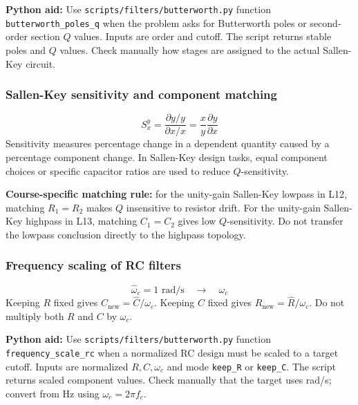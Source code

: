 \textbf{Python aid:} Use \texttt{scripts/filters/butterworth.py} function \texttt{butterworth\_poles\_q} when the problem asks for Butterworth poles or second-order section \(Q\) values. Inputs are order and cutoff. The script returns stable poles and \(Q\) values. Check manually how stages are assigned to the actual Sallen-Key circuit.

\subsubsection{Sallen-Key sensitivity and component matching}
\[
S_x^y=\frac{\partial y/y}{\partial x/x}=\frac{x}{y}\frac{\partial y}{\partial x}
\]
Sensitivity measures percentage change in a dependent quantity caused by a percentage component change. In Sallen-Key design tasks, equal component choices or specific capacitor ratios are used to reduce \(Q\)-sensitivity.

\textbf{Course-specific matching rule:} for the unity-gain Sallen-Key lowpass in L12, matching \(R_1=R_2\) makes \(Q\) insensitive to resistor drift. For the unity-gain Sallen-Key highpass in L13, matching \(C_1=C_2\) gives low \(Q\)-sensitivity. Do not transfer the lowpass conclusion directly to the highpass topology.

\subsubsection{Frequency scaling of RC filters}
\[
\hat\omega_c=1\text{ rad/s}\quad\to\quad \omega_c
\]
Keeping \(R\) fixed gives \(C_{\mathrm{new}}=\hat C/\omega_c\). Keeping \(C\) fixed gives \(R_{\mathrm{new}}=\hat R/\omega_c\). Do not multiply both \(R\) and \(C\) by \(\omega_c\).

\textbf{Python aid:} Use \texttt{scripts/filters/butterworth.py} function \texttt{frequency\_scale\_rc} when a normalized RC design must be scaled to a target cutoff. Inputs are normalized \(R,C,\omega_c\) and mode \texttt{keep\_R} or \texttt{keep\_C}. The script returns scaled component values. Check manually that the target uses rad/s; convert from Hz using \(\omega_c=2\pi f_c\).
